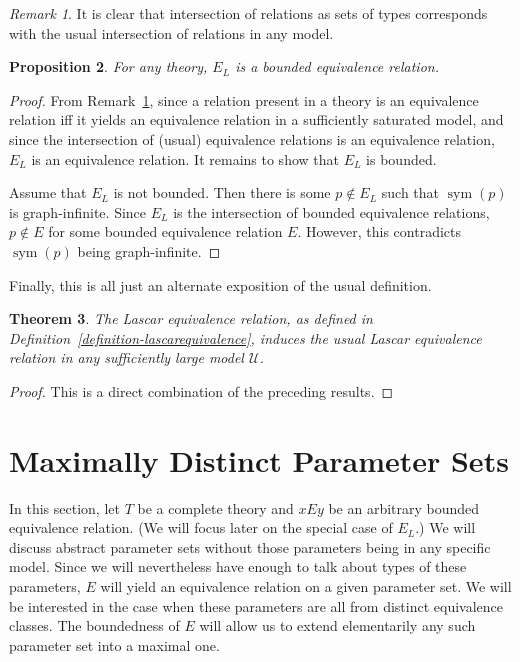 \documentclass[letterpaper,twoside]{article}
\newtheorem{theorem}{Theorem}[section]
\newtheorem{proposition}[theorem]{Proposition}
\theoremstyle{definition}
\theoremstyle{remark}
\newtheorem{remark}[theorem]{Remark}
\DeclareMathOperator{\sym}{sym}
\begin{document}
\begin{remark}\label{remark-relationintersection}
  It is clear that intersection of relations as sets of types
  corresponds with the usual intersection of relations in any model.
\end{remark}

\begin{proposition}
  For any theory, \(E_L\) is a bounded equivalence relation.
\end{proposition}
\begin{proof}
  From Remark~\ref{remark-relationintersection}, since a relation
  present in a theory is an equivalence relation iff it yields an
  equivalence relation in a sufficiently saturated model, and since
  the intersection of (usual) equivalence relations is an equivalence
  relation, \(E_L\) is an equivalence relation.  It remains to show
  that \(E_L\) is bounded.

  Assume that \(E_L\) is not bounded.  Then there is some \(p \notin
  E_L\) such that \(\sym(p)\) is graph-infinite.  Since \(E_L\) is the
  intersection of bounded equivalence relations, \(p \notin E\) for
  some bounded equivalence relation \(E\).  However, this contradicts
  \(\sym(p)\) being graph-infinite.
\end{proof}

Finally, this is all just an alternate exposition of the usual
definition.

\begin{theorem}
  The Lascar equivalence relation, as defined in
  Definition~\ref{definition-lascarequivalence}, induces the usual
  Lascar equivalence relation in any sufficiently large model
  \(\mathcal{U}\).
\end{theorem}
\begin{proof}
  This is a direct combination of the preceding results.
\end{proof}

\section{Maximally Distinct Parameter Sets}

In this section, let \(T\) be a complete theory and \(xEy\) be an
arbitrary bounded equivalence relation.  (We will focus later on the
special case of \(E_L\).)  We will discuss abstract parameter sets
without those parameters being in any specific model.  Since we will
nevertheless have enough to talk about types of these parameters,
\(E\) will yield an equivalence relation on a given parameter set.  We
will be interested in the case when these parameters are all from
distinct equivalence classes.  The boundedness of \(E\) will allow us
to extend elementarily any such parameter set into a maximal one.
\end{document}
